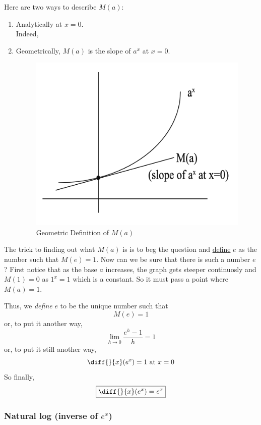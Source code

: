 Here are two ways to describe $M(a)$:
\begin{enumerate}
	\item Analytically  at $x=0$. \\
	Indeed, 
	\item Geometrically, $M(a)$ is the slope of $a^x$ at $x=0$. 

	\begin{figure}[ht!]
		\centering        
		\includegraphics[scale=0.4]{./images/lecture_6_figure_1.png}
		\caption{Geometric Definition of $M(a)$}
	\end{figure}
\end{enumerate}

The trick to finding out what $M(a)$ is is to beg the question and \underline{define} $e$ as the number such that $M(e) = 1$.
Now can we be sure that there is such a number $e$?
First notice that as the base $a$ increases, the graph gets steeper continuosly and $M(1) = 0$ as $1^x = 1$ which is a constant.
So it must pass a point where $M(a) = 1$.

Thus, we {\it define} $e$ to be the unique number such that $$ M(e) = 1 $$
or, to put it another way, $$ \lim_{h \to 0} \frac{e^h - 1}{h} = 1 $$
or, to put it still another way, $$\diff{}{x} (e^x) = 1 \text{ at } x = 0 $$
So finally, $$\boxed{\diff{}{x}(e^x) = e^x}$$


\subsubsection{Natural log (inverse of $e^x$)}

